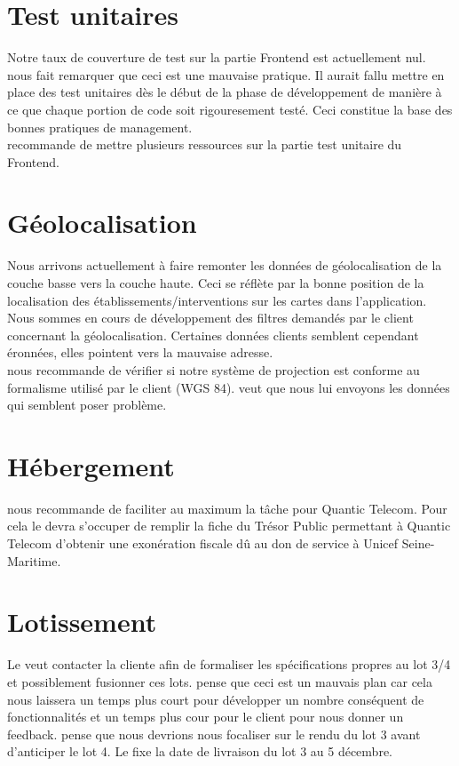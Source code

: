 \documentclass [a4paper] {article}
\begin{document}
\section{Test unitaires}
Notre taux de couverture de test sur la partie Frontend est actuellement nul. \nomTuteurPedago{} nous fait remarquer que ceci est une mauvaise pratique. Il aurait fallu mettre en place des test unitaires dès le début de la phase de développement de manière à ce que chaque portion de code soit rigouresement testé. Ceci constitue la base des bonnes pratiques de management.\\
\nomTuteurPedago{} recommande de mettre plusieurs ressources sur la partie test unitaire du Frontend.  

\section{Géolocalisation}
Nous arrivons actuellement à faire remonter les données de géolocalisation de la couche basse vers la couche haute. Ceci se réflète par la bonne position de la localisation des établissements/interventions sur les cartes dans l'application. Nous sommes en cours de développement des filtres demandés par le client concernant la géolocalisation. Certaines données clients semblent cependant éronnées, elles pointent vers la mauvaise adresse.\\
\nomTuteurPedago{} nous recommande de vérifier si notre système de projection est conforme au formalisme utilisé par le client (WGS 84). 
\nomTuteurPedago{} veut que nous lui envoyons les données qui semblent poser problème.

\section{Hébergement}
\nomTuteurPedago{} nous recommande de faciliter au maximum la tâche pour Quantic Telecom. Pour cela le \CP{} devra s'occuper de remplir la fiche du Trésor Public permettant à Quantic Telecom d'obtenir une exonération fiscale dû au don de service à Unicef Seine-Maritime.

\section{Lotissement}
Le \CP{} veut contacter la cliente afin de formaliser les spécifications propres au lot 3/4 et possiblement fusionner ces lots. \nomTuteurPedago{} pense que ceci est un mauvais plan car cela nous laissera un temps plus court pour développer un nombre conséquent de fonctionnalités et un temps plus cour pour le client pour nous donner un feedback.
\nomTuteurPedago{} pense que nous devrions nous focaliser sur le rendu du lot 3 avant d'anticiper le lot 4.
Le \CP{}  fixe la date de livraison du lot 3 au 5 décembre.
\end{document}
